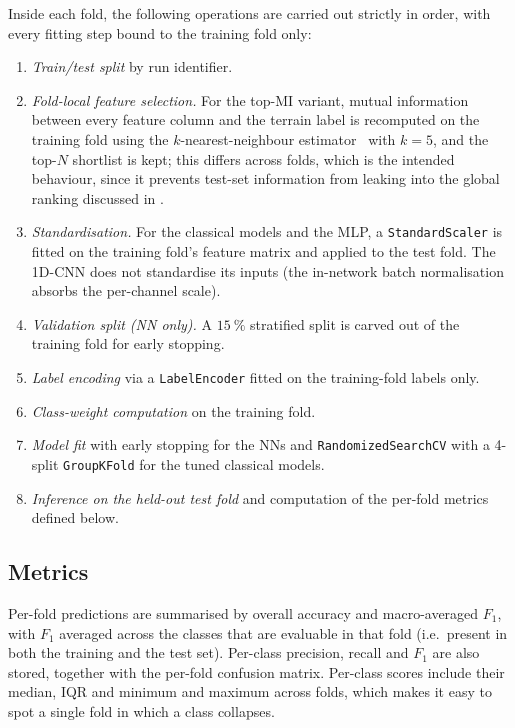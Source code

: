Inside each fold, the following operations are carried out strictly in order, with every fitting step bound to the training fold only:
\begin{enumerate}
    \item \emph{Train/test split} by run identifier.
    \item \emph{Fold-local feature selection.} For the top-MI variant, mutual information between every feature column and the terrain label is recomputed on the training fold using the $k$-nearest-neighbour estimator~\cite{Kraskov2004} with $k=5$, and the top-$N$ shortlist is kept; this differs across folds, which is the intended behaviour, since it prevents test-set information from leaking into the global ranking discussed in .
    \item \emph{Standardisation.} For the classical models and the MLP, a \texttt{StandardScaler} is fitted on the training fold's feature matrix and applied to the test fold. The 1D-CNN does not standardise its inputs (the in-network batch normalisation absorbs the per-channel scale).
    \item \emph{Validation split (NN only).} A $\SI{15}{\percent}$ stratified split is carved out of the training fold for early stopping.
    \item \emph{Label encoding} via a \texttt{LabelEncoder} fitted on the training-fold labels only.
    \item \emph{Class-weight computation} on the training fold.
    \item \emph{Model fit}  with early stopping for the NNs and \texttt{RandomizedSearchCV} with a 4-split \texttt{GroupKFold} for the tuned classical models.
    \item \emph{Inference on the held-out test fold} and computation of the per-fold metrics defined below.
\end{enumerate}

\subsection{Metrics}

Per-fold predictions are summarised by overall accuracy and macro-averaged $F_1$, with $F_1$ averaged across the classes that are evaluable in that fold (i.e.\ present in both the training and the test set). Per-class precision, recall and $F_1$ are also stored, together with the per-fold confusion matrix. Per-class scores include their median, IQR and minimum and maximum across folds, which makes it easy to spot a single fold in which a class collapses.


